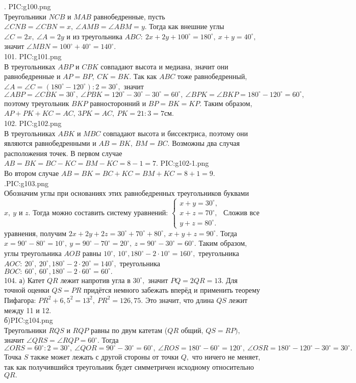 . {{PIC:g100.png}}\\
Треугольники $NCB$ и $MAB$ равнобедренные, пусть $\angle CNB=\angle CBN=x,\ \angle AMB=\angle ABM=y.$ Тогда как внешние углы $\angle C=2x,\ \angle A=2y$ и из треугольника $ABC:\ 2x+2y+100^\circ=180^\circ,\ x+y=40^\circ,$ значит $\angle MBN=100^\circ+40^\circ=140^\circ.$\\
101. {{PIC:g101.png}}\\
В треугольниках $ABP$ и $CBK$ совпадают высота и медиана, значит они равнобедренные и $AP=BP,\ CK=BK.$ Так как $ABC$ тоже равнобедренный, $\angle A=\angle C=(180^\circ-120^\circ):2=30^\circ,$ значит $\angle ABP=\angle CBK=30^\circ,\ \angle PBK=120^\circ-30^\circ-30^\circ=60^\circ,\ \angle BPK=\angle BKP=180^\circ-120^\circ=60^\circ,$ поэтому треугольник $BKP$ равносторонний и $BP=BK=KP.$ Таким образом, $AP+PK+KC=AC,\ 3PK=AC,\ PK=21:3=7$см.\\
102. {{PIC:g102.png}}\\
В треугольниках $ABK$ и $MBC$ совпадают высота и биссектриса, поэтому они являются равнобедренными и $AB=BK,\ BM=BC.$ Возможны два случая расположения точек. В первом случае $AB=BK=BC-KC=BM-KC=8-1=7.$
 {{PIC:g102-1.png}}\\
Во втором случае $AB=BK=BC+KC=BM+KC=8+1=9.$\newpage
{}.{{PIC:g103.png}}\\
Обозначим углы при основаниях этих равнобедренных треугольников буквами $x,\ y$ и $z.$ Тогда можно составить систему уравнений: $\begin{cases}x+y=30^\circ,\\
x+z=70^\circ,\\ y+z=80^\circ.\end{cases}$ Сложив все уравнения, получим $2x+2y+2z=30^\circ+70^\circ+80^\circ,\ x+y+z=90^\circ.$ Тогда $x=90^\circ-80^\circ=10^\circ,\ y=90^\circ-70^\circ=20^\circ,\ z=90^\circ-30^\circ=60^\circ.$ Таким образом, углы треугольника $AOB$ равны $10^\circ,\ 10^\circ, 180^\circ-2\cdot10^\circ=160^\circ,$ треугольника $AOC:\ 20^\circ,\ 20^\circ, 180^\circ-2\cdot20^\circ=140^\circ,$ треугольника $BOC:\ 60^\circ,\ 60^\circ, 180^\circ-2\cdot60^\circ=60^\circ.$\\
104. а) Катет $QR$ лежит напротив угла в $30^\circ,$ значит $PQ=2QR=13.$ Для точной оценки $QS=PR$ придётся немного забежать вперёд и применить теорему Пифагора: $PR^2+6,5^2=13^2,\ PR^2=126,75.$ Это значит, что длина $QS$ лежит между 11 и 12.\\
б){{PIC:g104.png}}\\
Треугольники $RQS$ и $RQP$ равны по двум катетам ($QR$ общий, $QS=RP),$ значит $\angle QRS=\angle RQP=60^\circ.$ Тогда $\angle ORS=60^\circ:2=30^\circ,\ \angle QOR=90^\circ-30^\circ=60^\circ,\ \angle ROS=180^\circ-60^\circ=120^\circ,\ \angle OSR=180^\circ-120^\circ-30^\circ=30^\circ.$ Точка $S$ также может лежать с другой стороны от точки $Q,$ что ничего не меняет, так как получившийся треугольник будет симметричен исходному относительно $QR.$\\
